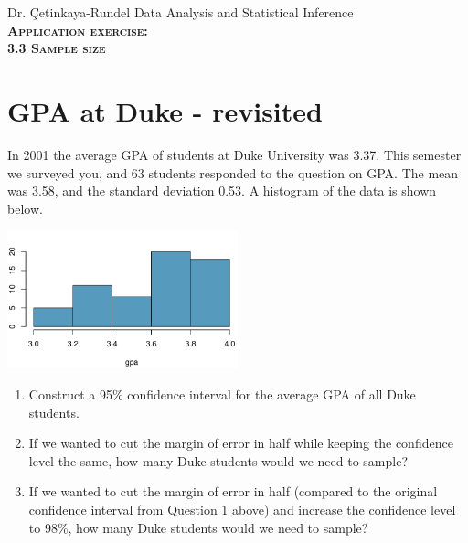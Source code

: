 \documentclass[11pt]{article}
\newcommand{\ttl}[1]{ \textsc{{\LARGE \textbf{{\color{oiB} #1} } }}}
\begin{document}
Dr. \c{C}etinkaya-Rundel \hfill Data Analysis and Statistical Inference \\

\ttl{Application exercise: \\
3.3 Sample size} 

\section*{GPA at Duke - revisited}

In 2001 the average GPA of students at Duke University was 3.37. This semester we surveyed you, and 63 students responded to the question on GPA. The mean was 3.58, and the standard deviation 0.53. A histogram of the data is shown below.

\begin{center}
\includegraphics[width=0.5\textwidth]{survey/hist_gpa}
\end{center}

\begin{enumerate}

\item Construct a 95\% confidence interval for the average GPA of all Duke students.

\item If we wanted to cut the margin of error in half while keeping the confidence level the same, how many Duke students would we need to sample?

\item If we wanted to cut the margin of error in half (compared to the original confidence interval from Question 1 above) and increase the confidence level to 98\%, how many Duke students would we need to sample?

\end{enumerate}

%
\end{document}
